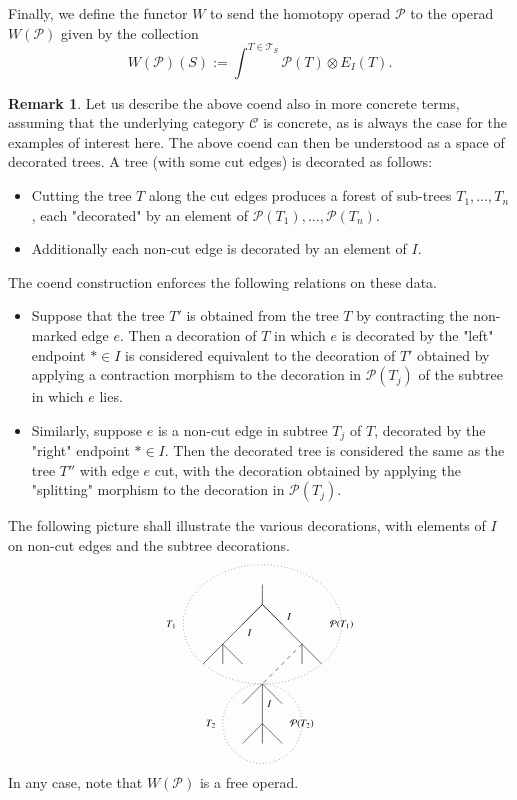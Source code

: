 \documentclass[a4paper]{amsart}
\theoremstyle{plain}
\theoremstyle{definition}
\newtheorem{rem}[thm]{Remark}
\newcommand{\op}{\mathcal}
\newcommand{\mC}{{\mathcal{C}}}
\newcommand{\mT}{{\mathcal{T}}}
\begin{document}
Finally, we define the functor $W$ to send the homotopy operad $\op P$ to the operad $W(\op P)$ given by the collection
\[
W(\op P)(S) := \int^{T\in \mT_S} \op P(T)\otimes E_I(T).
\]
\begin{rem}
Let us describe the above coend also in more concrete terms, assuming that the underlying category $\mC$ is concrete, as is always the case for the examples of interest here.
The above coend can then be understood as a space of decorated trees.
A tree (with some cut edges) is decorated as follows:
\begin{itemize}
\item Cutting the tree $T$ along the cut edges produces a forest of sub-trees $T_1,\dots,T_n$, each "decorated" by an element of $\op P(T_1),\dots, \op P(T_n)$.
\item Additionally each non-cut edge is decorated by an element of $I$.
\end{itemize}
The coend construction enforces the following relations on these data.
\begin{itemize}
\item Suppose that the tree $T'$ is obtained from the tree $T$ by contracting the non-marked edge $e$.
Then a decoration of $T$ in which $e$ is decorated by the "left" endpoint $*\in I$ is considered equivalent to the decoration of $T'$ obtained by applying a contraction morphism to the decoration in $\op P(T_j)$ of the subtree in which $e$ lies.
\item Similarly, suppose $e$ is a non-cut edge in subtree $T_j$ of $T$, decorated by the "right" endpoint $*\in I$. Then the decorated tree is considered the same as the tree $T''$ with edge $e$ cut, with the decoration obtained by applying the "splitting" morphism to the decoration in $\op P(T_j)$. 
\end{itemize}
The following picture shall illustrate the various decorations, with elements of $I$ on non-cut edges and the subtree decorations.
\[
\begin{tikzpicture}
\coordinate (v1) at (0,2);
\coordinate (v2) at (-1,1);
\coordinate (v3) at (1,1);
\coordinate (v4) at (0,0);
\coordinate (v5) at (0,-1);
\draw (v1) edge node[auto]{$\scriptstyle I$} (v2) edge node[auto]{$\scriptstyle I$} (v3) edge +(-.5,-.5)  edge +(.5,-.5)  edge +(0,.5)
	 (v2) edge +(-.5,-.5)  edge +(.5,-.5)  edge +(0,-.5)
          (v3) edge[dashed] (v4) edge +(.5,-.5)  edge +(0,-.5)
          (v4) edge node[auto]{$\scriptstyle I$} (v5) edge +(-.5,-.5)  edge +(.5,-.5) 
          (v5) edge +(-.5,-.5)  edge +(.5,-.5)  edge +(0,-.5);
 \draw[dotted] (0,1.5) ellipse (2 and 1.5);
 \node at (-2.3,1.5) {$\scriptstyle T_1$};
  \draw[dotted] (0,-1) ellipse (1 and 1);
   \node at (-1.3,-1) {$\scriptstyle T_2$};
   \node at (2,1.5) {$\scriptstyle \op P(T_1)$};
   \node at (1,-1) {$\scriptstyle \op P(T_2)$};
\end{tikzpicture}
\]
In any case, note that $W(\op P)$ is a free operad.
\end{rem}
\end{document}
